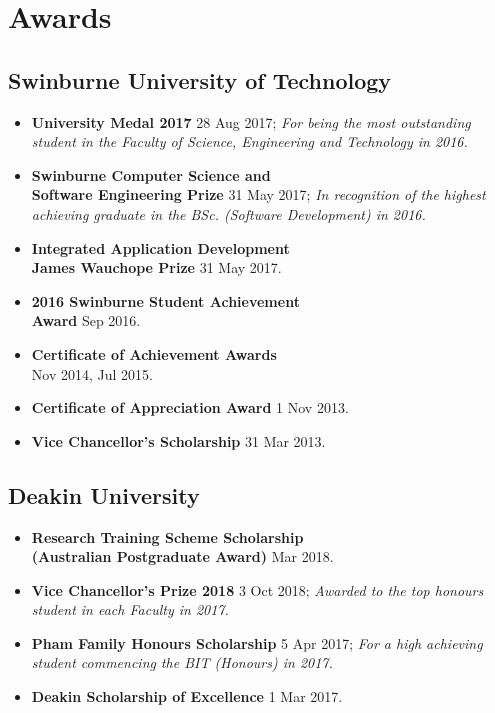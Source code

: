 \section{Awards}
\small

\begin{multicols}{2}
\raggedright

\subsection{Swinburne University of Technology}

\begin{itemize}
  \item \textbf{University Medal 2017} 28 Aug 2017; \textit{For being the most outstanding student in the Faculty of Science, Engineering and Technology in 2016.}
  \item \textbf{Swinburne Computer Science and\\
        Software Engineering Prize} 31 May 2017; \textit{In recognition of the highest achieving graduate in the BSc. (Software Development) in 2016.}
  \item \textbf{Integrated Application Development\\
        James Wauchope Prize} 31 May 2017.
  \item \textbf{2016 Swinburne Student Achievement\\Award} Sep 2016.
  \item \textbf{Certificate of Achievement Awards}\\Nov 2014, Jul 2015.
  \item \textbf{Certificate of Appreciation Award} 1 Nov 2013.
  \item \textbf{Vice Chancellor's Scholarship} 31 Mar 2013.
\end{itemize}

\columnbreak

\subsection{Deakin University}

\begin{itemize}
  \item \textbf{Research Training Scheme Scholarship\\
        (Australian Postgraduate Award)} Mar 2018.
  \item \textbf{Vice Chancellor's Prize 2018} 3 Oct 2018; \textit{Awarded to the top honours student in each Faculty in 2017.}
  \item \textbf{Pham Family Honours Scholarship} 5 Apr 2017; \textit{For a high achieving student commencing the BIT (Honours) in 2017.}
  \item \textbf{Deakin Scholarship of Excellence} 1 Mar 2017.
\end{itemize}


\end{multicols}
